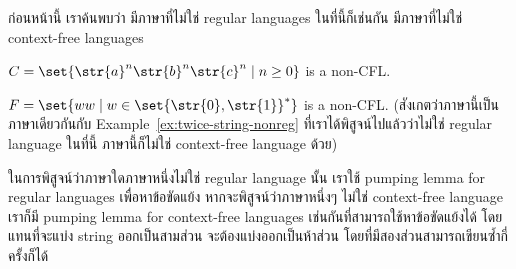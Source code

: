ก่อนหน้านี้ เราค้นพบว่า มีภาษาที่ไม่ใช่ regular languages \enskip ในที่นี้ก็เช่นกัน มีภาษาที่ไม่ใช่ context-free languages

\begin{example}
$C=\set{\str{a}^n\str{b}^n\str{c}^n\mid n\geq 0}$ is a non-CFL.
\end{example}

\begin{example}
$F=\set{ww\mid w\in\set{\str{0},\str{1}}^*}$ is a non-CFL.  (สังเกตว่าภาษานี้เป็นภาษาเดียวกันกับ Example~\ref{ex:twice-string-nonreg} ที่เราได้พิสูจน์ไปแล้วว่าไม่ใช่ regular language \enskip ในที่นี้ ภาษานี้ก็ไม่ใช่ context-free language ด้วย)
\end{example}

ในการพิสูจน์ว่าภาษาใดภาษาหนึ่งไม่ใช่ regular language นั้น เราใช้ pumping lemma for regular languages เพื่อหาข้อขัดแย้ง \enskip หากจะพิสูจน์ว่าภาษาหนึ่งๆ ไม่ใช่ context-free language เราก็มี pumping lemma for context-free languages เช่นกันที่สามารถใช้หาข้อขัดแย้งได้ โดยแทนที่จะแบ่ง string ออกเป็นสามส่วน จะต้องแบ่งออกเป็นห้าส่วน โดยที่มีสองส่วนสามารถเขียนซ้ำกี่ครั้งก็ได้
